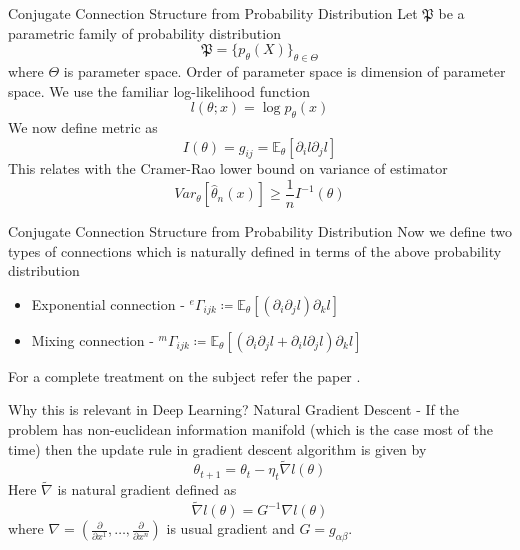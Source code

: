 \documentclass{beamer}
\begin{document}
\begin{frame}{Conjugate Connection Structure from Probability Distribution}
    Let $\mathfrak{P}$ be a parametric family of probability distribution
\begin{equation*}
    \mathfrak{P}=\{p_{\theta}(X)\}_{\theta\in \Theta}
\end{equation*} where $\Theta$ is parameter space. Order of parameter space is dimension of parameter space. We use the familiar log-likelihood function
\begin{equation*}
    l(\theta; x) = \log p_{\theta}(x) 
\end{equation*}
We now define metric as 
\begin{equation*}
    I(\theta) = g_{ij} = \mathbb{E}_{\theta}[\partial_{i}l\partial_{j}l]
\end{equation*}
This relates with the Cramer-Rao lower bound on variance of estimator
\begin{equation*}
    Var_{\theta}[\hat{\theta}_{n}(x)] \geq \frac{1}{n}I^{-1}(\theta)
\end{equation*}
\end{frame}
\begin{frame}{Conjugate Connection Structure from Probability Distribution}
    Now we define two types of connections which is naturally defined in terms of the above probability distribution
    \vspace{10mm}
\begin{itemize}
    \item Exponential connection - $^{e}\Gamma_{ijk} \coloneqq \mathbb{E}_{\theta}[(\partial_{i}\partial_{j}l)\partial_{k}l]$
    \vspace{5mm}
    \item Mixing connection - $^{m}\Gamma_{ijk} \coloneqq \mathbb{E}_{\theta}[(\partial_{i}\partial_{j}l + \partial_{i}l\partial_{j}l)\partial_{k}l]$
\end{itemize}
\vspace{5mm}
For a complete treatment on the subject refer  the paper .
\end{frame}
\begin{frame}{Why this is relevant in Deep Learning?}
    Natural Gradient Descent - If the problem has non-euclidean information manifold (which is the case most of the time) then the update rule in gradient descent algorithm is given by
    \begin{equation*}
        \theta_{t+1} = \theta_{t} - \eta_{t}\tilde{\nabla}l(\theta)
    \end{equation*} Here $\tilde{\nabla}$ is natural gradient defined as
    \begin{equation*}
        \tilde{\nabla}l(\theta) = G^{-1}\nabla l(\theta)
    \end{equation*} where $\nabla = (\frac{\partial}{\partial x^{1}}, \dots, \frac{\partial}{\partial x^{n}})$ is usual gradient and $G = g_{\alpha\beta}$.
\end{frame}
\end{document}
